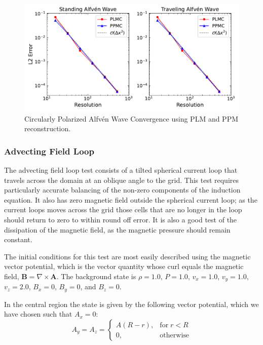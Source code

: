 \begin{figure}[ht!]
    \includegraphics[width=\linewidth]{assets/3-mhd-tests/cpaw_convergence.pdf}
    \caption{Circularly Polarized Alfv\'en Wave Convergence using PLM and PPM reconstruction. }
    \label{fig:cpaw}
\end{figure}

\subsubsection{Advecting Field Loop}
\label{sec:afl}

The advecting field loop test consists of a tilted spherical current loop that travels across the domain at an oblique angle to the grid. This test requires particularly accurate balancing of the non-zero components of the induction equation. It also has zero magnetic field outside the spherical current loop; as the current loops moves across the grid those cells that are no longer in the loop should return to zero to within round off error. It is also a good test of the dissipation of the magnetic field, as the magnetic pressure should remain constant.

The initial conditions for this test are most easily described using the magnetic vector potential, which is the vector quantity whose curl equals the magnetic field, $\boldsymbol{B} = \nabla \times\boldsymbol{A}$. The background state is
$\rho = 1.0$,
$P = 1.0$,
$v_x = 1.0$,
$v_y = 1.0$,
$v_z = 2.0$,
$B_x = 0$,
$B_y = 0$, and
$B_z = 0$.

In the central region the state is given by the following vector potential, which we have chosen such that $A_x = 0$:
\begin{equation}
    A_y = A_z = 
    \begin{cases}
        A \left( R - r \right),& \text{for}\; r < R\\
        0,              & \text{otherwise}
    \end{cases}
\end{equation}

